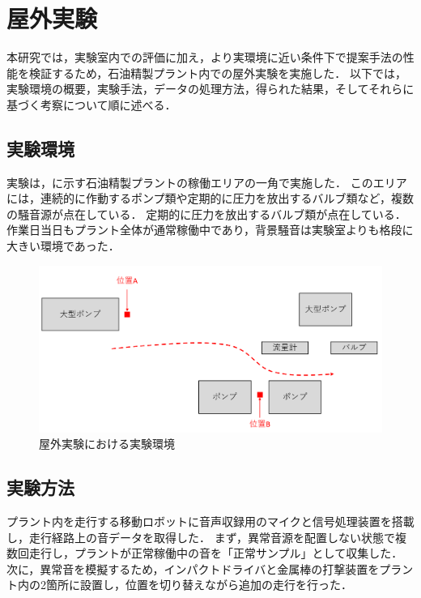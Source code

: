 \documentclass[../main]{subfiles}
\begin{document}
\section{屋外実験}
\label{sec:outdoor_experiment}
本研究では，実験室内での評価に加え，より実環境に近い条件下で提案手法の性能を検証するため，石油精製プラント内での屋外実験を実施した．
以下では，実験環境の概要，実験手法，データの処理方法，得られた結果，そしてそれらに基づく考察について順に述べる．
\subsection{実験環境}
\label{subsec:vexp_ci_environment}
実験は，に示す石油精製プラントの稼働エリアの一角で実施した．
このエリアには，連続的に作動するポンプ類や定期的に圧力を放出するバルブ類など，複数の騒音源が点在している．
定期的に圧力を放出するバルブ類が点在している．作業日当日もプラント全体が通常稼働中であり，背景騒音は実験室よりも格段に大きい環境であった．

\begin{figure}[t]
  \centering
  \includegraphics[keepaspectratio, width=1.0\linewidth]{chap4/field_environment.png}
  \caption{屋外実験における実験環境}
  \label{fig:field_environment}
\end{figure}

\subsection{実験方法}
\label{subsec:vexp_ci_method}
プラント内を走行する移動ロボットに音声収録用のマイクと信号処理装置を搭載し，走行経路上の音データを取得した．
まず，異常音源を配置しない状態で複数回走行し，プラントが正常稼働中の音を「正常サンプル」として収集した．
次に，異常音を模擬するため，インパクトドライバと金属棒の打撃装置をプラント内の2箇所に設置し，位置を切り替えながら追加の走行を行った．
\end{document}
